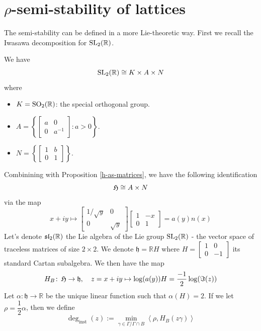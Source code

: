 \section{$\rho$-semi-stability of lattices}
The semi-stability can be defined in a more Lie-theoretic way. First we recall the Iwasawa decomposition
for $\operatorname{SL_2(\mathbb{R})}$.
\begin{prop}
  We have
  \[\operatorname{SL_2(\mathbb{R})} \cong K \times A \times N\]
  where
  \begin{itemize}
    \item $K=\SO2$: the special orthogonal group.
    \item $A = \left\lbrace \begin{bmatrix}
              a & 0      \\
              0 & a^{-1}
            \end{bmatrix}: a >0 \right\rbrace$.
    \item  $N = \left\lbrace \begin{bmatrix}
              1 & b \\
              0 & 1
            \end{bmatrix}\right\rbrace$.
  \end{itemize}
\end{prop}
Combinining with Proposition \ref{h-as-matrices}, we have the following identification
\[\operatorname{\mathfrak{H}} \cong A \times N\]
via the map
\[x+iy \mapsto \begin{bmatrix}
    1/\sqrt{y} & 0        \\
    0          & \sqrt{y}
  \end{bmatrix}\begin{bmatrix}
    1 & -x \\
    0 & 1
  \end{bmatrix} = a\left(y\right)n(x)\]
Let's denote $\sl2$ the Lie algebra of the Lie group $\operatorname{SL_2(\mathbb{R})}$ - the vector space of traceless matrices of size $2 \times 2$. We denote
$\mathfrak{h} = \mathbb{R}H$ where $H =\begin{bmatrix}
    1 & 0  \\
    0 & -1
  \end{bmatrix}$ its standard Cartan subalgebra. We then have the map
\begin{align*}
  H_B \colon \operatorname{\mathfrak{H}} \to \mathfrak{h}, \quad
  z = x+iy \mapsto \log(a(y))H = \frac{-1}{2}\log(\Im(z))
\end{align*}
Let $\alpha\colon \mathfrak{h} \to \mathbb{R}$ be the unique linear function such that
$\alpha(H)=2$. If we let $\rho = \dfrac{1}{2}\alpha$, then we define
\[\deg_{\text{inst}}(z):= \min_{\gamma \in  \Gamma/\Gamma \cap B} \left\langle \rho,H_B(z\gamma) \right\rangle\]
